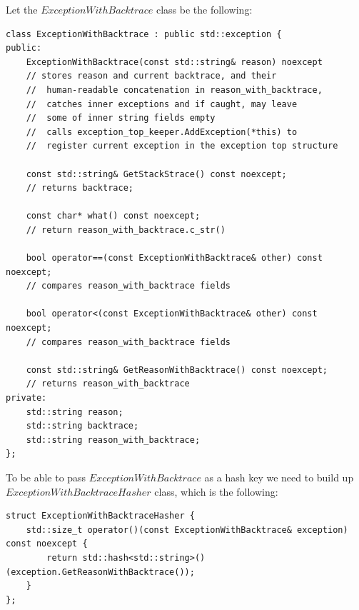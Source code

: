 \documentclass{article}
\begin{document}
Let the $ExceptionWithBacktrace$ class be the following:
\begin{lstlisting}
class ExceptionWithBacktrace : public std::exception {
public:
	ExceptionWithBacktrace(const std::string& reason) noexcept
	// stores reason and current backtrace, and their
	//	human-readable concatenation in reason_with_backtrace,
	//	catches inner exceptions and if caught, may leave
	//	some of inner string fields empty
	//	calls exception_top_keeper.AddException(*this) to
	//	register current exception in the exception top structure

	const std::string& GetStackStrace() const noexcept;
	// returns backtrace;

	const char* what() const noexcept;
	// return reason_with_backtrace.c_str()

	bool operator==(const ExceptionWithBacktrace& other) const noexcept;
	// compares reason_with_backtrace fields

	bool operator<(const ExceptionWithBacktrace& other) const noexcept;
	// compares reason_with_backtrace fields

	const std::string& GetReasonWithBacktrace() const noexcept;
	// returns reason_with_backtrace
private:
	std::string reason;
	std::string backtrace;
	std::string reason_with_backtrace;
};
\end{lstlisting}

To be able to pass $ExceptionWithBacktrace$ as a hash key we need to build up $ExceptionWithBacktraceHasher$ class, which is the following:
\begin{lstlisting}
struct ExceptionWithBacktraceHasher {
	std::size_t operator()(const ExceptionWithBacktrace& exception) const noexcept {
		return std::hash<std::string>()(exception.GetReasonWithBacktrace());
	}
};
\end{lstlisting}
\end{document}
